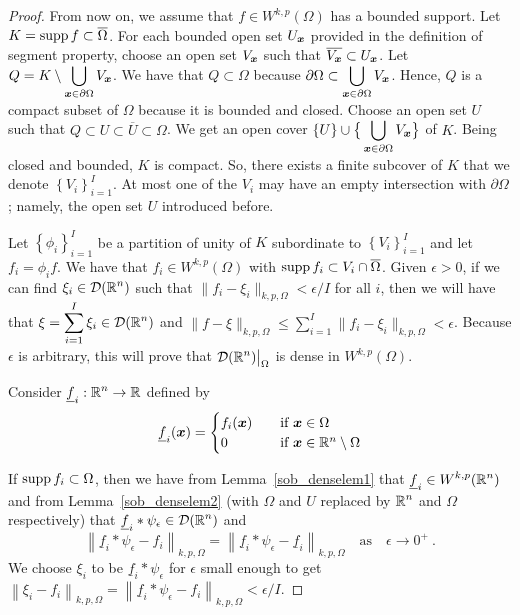 \begin{proof}
 From now on, we assume that $\displaystyle f \in W^{k,p}(\Omega)$
has a bounded support.  Let
$\displaystyle K = \operatorname{supp} f \subset \overline{\Omega}$.
For each bounded open set $U_{{\bm{x}}}$ provided in the definition of
segment property, choose an open set
$V_{{\bm{x}}}$ such that
$\displaystyle \overline{V_{{\bm{x}}}} \subset U_{{\bm{x}}}$.
Let
$\displaystyle Q = K \setminus \bigcup_{{\bm{x}} \in \partial \Omega} V_{{\bm{x}}}$.
We have that $Q \subset \Omega$ because
$\displaystyle \partial \Omega \subset \bigcup_{{\bm{x}}
\in \partial \Omega} V_{{\bm{x}}}$.
Hence, $Q$ is a compact subset of $\Omega$ because it is
bounded and closed.  Choose an open set $U$ such that
$Q \subset U \subset \overline{U} \subset \Omega$.
We get an open cover $\displaystyle \left\{U\right\} \cup
\big\{ \bigcup_{{\bm{x}} \in \partial \Omega} V_{{\bm{x}}} \big\}$ of $K$.
Being closed and bounded, $K$ is compact.  So, there exists a finite
subcover of $K$ that we denote $\displaystyle \left\{ V_i \right\}_{i=1}^I$.
At most one of the $V_i$ may have an empty intersection with $\partial \Omega$;
namely, the open set $U$ introduced before.

Let $\displaystyle \left\{ \phi_i \right\}_{i=1}^I$ be a partition
of unity of $K$ subordinate to $\displaystyle \left\{ V_i \right\}_{i=1}^I$
and let $\displaystyle f_i = \phi_i f$.  We have that
$\displaystyle f_i \in W^{k,p}(\Omega)$ with
$\operatorname{supp} f_i \subset V_i \cap \overline{\Omega}$.
Given $\epsilon >0$, if we can find $\displaystyle \xi_i \in \mathcal{D}(\mathbb{R}^n)$
such that $\displaystyle \|f_i - \xi_i\|_{k,p,\Omega} < \epsilon/I$ for all $i$,
then we will have that $\displaystyle \xi = \sum_{i=1}^I \xi_i \in \mathcal{D}(\mathbb{R}^n)$
and $\displaystyle \|f - \xi\|_{k,p,\Omega}
\leq \sum_{i=1}^I \|f_i - \xi_i\|_{k,p,\Omega} < \epsilon$.  Because
$\epsilon$ is arbitrary, this will prove that
$\displaystyle \mathcal{D}(\mathbb{R}^n)\big|_{\Omega}$ is dense in $W^{k,p}(\Omega)$.

Consider $\displaystyle \underline{f}_i : \mathbb{R}^n \to \mathbb{R}$ defined by
\[
\underline{f}_i({\bm{x}})
= \begin{cases}
f_i({\bm{x}}) & \quad \text{if} \ {\bm{x}} \in \Omega \\
0 & \quad \text{if} \ {\bm{x}} \in \mathbb{R}^n \setminus \Omega
\end{cases}
\]

If $\operatorname{supp} f_i \subset \Omega$, then we have from
Lemma~\ref{sob_denselem1} that
$\displaystyle \underline{f}_i \in W^{k,p}(\mathbb{R}^n)$
and from Lemma~\ref{sob_denselem2} (with $\Omega$ and $U$ replaced by
$\displaystyle \mathbb{R}^n$ and $\Omega$ respectively) that
$\displaystyle \underline{f}_i \ast \psi_\epsilon \in \mathcal{D}(\mathbb{R}^n)$ and
\[
\left\| \underline{f}_i \ast \psi_\epsilon - f_i \right\|_{k,p,\Omega}
= \left\| \underline{f}_i \ast \psi_\epsilon
- \underline{f}_i \right\|_{k,p,\Omega}
\quad \text{as} \quad \epsilon \to 0^+ \ .
\]
We choose $\xi_i$ to be $\underline{f}_i \ast \psi_\epsilon$
for $\epsilon$ small enough to get
$\displaystyle \left\|\xi_i - f_i\right\|_{k,p,\Omega}
= \left\| \underline{f}_i \ast \psi_\epsilon - f_i \right\|_{k,p,\Omega}
< \epsilon/I$.


\end{proof}
